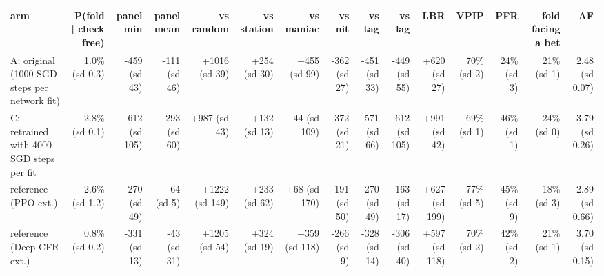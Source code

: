 \begin{tabular}{lrrrrrrrrrrrrrr}
\toprule
arm & P(fold | check free) & panel min & panel mean & vs random & vs station & vs maniac & vs nit & vs tag & vs lag & LBR & VPIP & PFR & fold facing a bet & AF \\
\midrule
A: original (1000 SGD steps per network fit) & 1.0\% (sd 0.3) & -459 (sd 43) & -111 (sd 46) & +1016 (sd 39) & +254 (sd 30) & +455 (sd 99) & -362 (sd 27) & -451 (sd 33) & -449 (sd 55) & +620 (sd 27) & 70\% (sd 2) & 24\% (sd 3) & 21\% (sd 1) & 2.48 (sd 0.07) \\
C: retrained with 4000 SGD steps per fit & 2.8\% (sd 0.1) & -612 (sd 105) & -293 (sd 60) & +987 (sd 43) & +132 (sd 13) & -44 (sd 109) & -372 (sd 21) & -571 (sd 66) & -612 (sd 105) & +991 (sd 42) & 69\% (sd 1) & 46\% (sd 1) & 24\% (sd 0) & 3.79 (sd 0.26) \\
reference (PPO ext.) & 2.6\% (sd 1.2) & -270 (sd 49) & -64 (sd 5) & +1222 (sd 149) & +233 (sd 62) & +68 (sd 170) & -191 (sd 50) & -270 (sd 49) & -163 (sd 17) & +627 (sd 199) & 77\% (sd 5) & 45\% (sd 9) & 18\% (sd 3) & 2.89 (sd 0.66) \\
reference (Deep CFR ext.) & 0.8\% (sd 0.2) & -331 (sd 13) & -43 (sd 31) & +1205 (sd 54) & +324 (sd 19) & +359 (sd 118) & -266 (sd 9) & -328 (sd 14) & -306 (sd 40) & +597 (sd 118) & 70\% (sd 2) & 42\% (sd 2) & 21\% (sd 1) & 3.70 (sd 0.15) \\
\bottomrule
\end{tabular}
